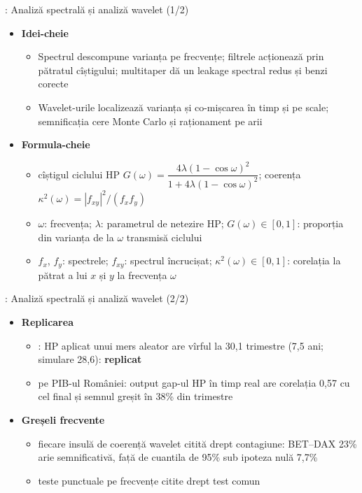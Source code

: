 \begin{frame}{: Analiză spectrală și analiză wavelet (1/2)}
\itemsize{\footnotesize}
\begin{itemize}
    \item \textbf{Idei-cheie}
    \begin{itemize}
        \item Spectrul descompune varianța pe frecvențe; filtrele acționează prin pătratul cîștigului; multitaper dă un leakage spectral redus și benzi corecte
        \item Wavelet-urile localizează varianța și co-mișcarea în timp și pe scale; semnificația cere Monte Carlo și raționament pe arii
    \end{itemize}
    \item \textbf{Formula-cheie}
    \begin{itemize}
        \item cîștigul ciclului HP $G(\omega) = \dfrac{4\lambda(1 - \cos\omega)^2}{1 + 4\lambda(1 - \cos\omega)^2}$; coerența $\kappa^2(\omega) = |f_{xy}|^2/(f_xf_y)$
        \item $\omega$: frecvența; $\lambda$: parametrul de netezire HP; $G(\omega) \in [0, 1]$: proporția din varianța de la $\omega$ transmisă ciclului
        \item $f_x$, $f_y$: spectrele; $f_{xy}$: spectrul încrucișat; $\kappa^2(\omega) \in [0, 1]$: corelația la pătrat a lui $x$ și $y$ la frecvența $\omega$
    \end{itemize}
\end{itemize}
\end{frame}

\begin{frame}{: Analiză spectrală și analiză wavelet (2/2)}
\itemsize{\small}
\begin{itemize}
    \item \textbf{Replicarea}
    \begin{itemize}
        \item {}: HP aplicat unui mers aleator are vîrful la 30{,}1 trimestre (7{,}5 ani; simulare 28{,}6): \textbf{replicat}
        \item {} pe PIB-ul României: output gap-ul HP în timp real are corelația 0{,}57 cu cel final și semnul greșit în 38\% din trimestre
    \end{itemize}
    \item \textbf{Greșeli frecvente}
    \begin{itemize}
        \item fiecare insulă de coerență wavelet citită drept contagiune: BET--DAX 23\% arie semnificativă, față de cuantila de 95\% sub ipoteza nulă 7{,}7\%
        \item teste punctuale pe frecvențe citite drept test comun
    \end{itemize}
\end{itemize}
\end{frame}

